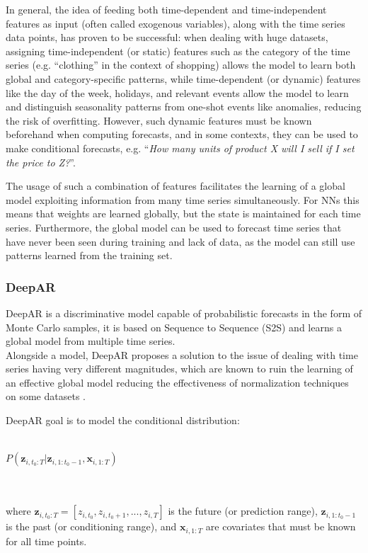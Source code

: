 \documentclass[a4paper, 12pt]{article} %
\begin{document}
	In general, the idea of feeding both time-dependent and time-independent features as input (often called exogenous variables), along with the time series data points, has proven to be successful: when dealing with huge datasets, assigning time-independent (or static) features such as the category of the time series (e.g. ``clothing'' in the context of shopping) allows the model to learn both global and category-specific patterns, while time-dependent (or dynamic) features like the day of the week, holidays, and relevant events allow the model to learn and distinguish seasonality patterns from one-shot events like anomalies, reducing the risk of overfitting. However, such dynamic features must be known beforehand when computing forecasts, and in some contexts, they can be used to make conditional forecasts, e.g. ``\textit{How many units of product X will I sell if I set the price to Z?}''.
	
	The usage of such a combination of features facilitates the learning of a global model exploiting information from many time series simultaneously. For NNs this means that weights are learned globally, but the state is maintained for each time series. Furthermore, the global model can be used to forecast time series that have never been seen during training and lack of data, as the model can still use patterns learned from the training set.
	
	
	\subsubsection{DeepAR } \label{sssec:deepar}
	DeepAR \cite{DeepAR} is a discriminative model capable of probabilistic forecasts in the form of Monte Carlo samples, it is based on Sequence to Sequence (S2S) \cite{seq2seq} and learns a global model from multiple time series.\\
	Alongside a model, DeepAR proposes a solution to the issue of dealing with time series having very different magnitudes, which are known to ruin the learning of an effective global model reducing the effectiveness of normalization techniques on some datasets \cite{DeepAR}.
	
	DeepAR goal is to model the conditional distribution:\\\\
	\centerline{
		$
		P(\pmb{z}_{i, t_0:T} | \pmb{z}_{i, 1:t_0-1}, \pmb{x}_{i, 1:T})
		$
	}\\\\
	where $\pmb{z}_{i, t_0:T} = [z_{i,t_0}, z_{i, t_0+1}, ..., z_{i, T}]$ is the future (or prediction range), $\pmb{z}_{i, 1:t_0-1}$ is the past (or conditioning range), and $\pmb{x}_{i, 1:T}$ are covariates that must be known for all time points.
	
\end{document}
